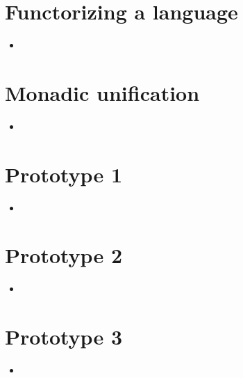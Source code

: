 \documentclass{beamer}
\begin{document}
\clearpage

\section{Functorizing a language}
\begin{frame}
\begin{itemize}
\item
\end{itemize}

\end{frame}


\clearpage

\section{Monadic unification}
\begin{frame}
\begin{itemize}
\item
\end{itemize}

\end{frame}


\clearpage

\section{Prototype 1}
\begin{frame}
\begin{itemize}
\item
\end{itemize}

\end{frame}


\clearpage

\section{Prototype 2}
\begin{frame}
\begin{itemize}
\item
\end{itemize}

\end{frame}


\clearpage

\section{Prototype 3}
\begin{frame}
\begin{itemize}
\item
\end{itemize}

\end{frame}
\end{document}
